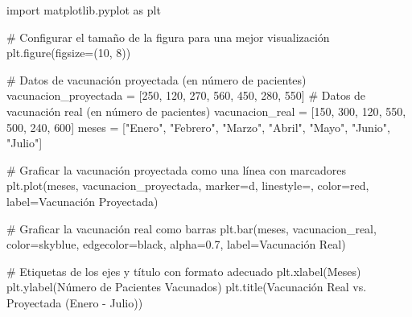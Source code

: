 \documentclass[
  jou,
  floatsintext,
  longtable,
  a4paper,
  nolmodern,
  notxfonts,
  notimes,
  colorlinks=true,linkcolor=blue,citecolor=blue,urlcolor=blue]{apa7}
\newenvironment{Shaded}{\begin{snugshade}}{\end{snugshade}}
\newcommand{\CommentTok}[1]{\textcolor[rgb]{0.37,0.37,0.37}{#1}}
\newcommand{\DecValTok}[1]{\textcolor[rgb]{0.68,0.00,0.00}{#1}}
\newcommand{\FloatTok}[1]{\textcolor[rgb]{0.68,0.00,0.00}{#1}}
\newcommand{\ImportTok}[1]{\textcolor[rgb]{0.00,0.46,0.62}{#1}}
\newcommand{\NormalTok}[1]{\textcolor[rgb]{0.00,0.23,0.31}{#1}}
\newcommand{\OperatorTok}[1]{\textcolor[rgb]{0.37,0.37,0.37}{#1}}
\newcommand{\StringTok}[1]{\textcolor[rgb]{0.13,0.47,0.30}{#1}}
\begin{document}
\begin{Shaded}
\begin{Highlighting}[]
\ImportTok{import}\NormalTok{ matplotlib.pyplot }\ImportTok{as}\NormalTok{ plt}

\CommentTok{\# Configurar el tamaño de la figura para una mejor visualización}
\NormalTok{plt.figure(figsize}\OperatorTok{=}\NormalTok{(}\DecValTok{10}\NormalTok{, }\DecValTok{8}\NormalTok{))}

\CommentTok{\# Datos de vacunación proyectada (en número de pacientes)}
\NormalTok{vacunacion\_proyectada }\OperatorTok{=}\NormalTok{ [}\DecValTok{250}\NormalTok{, }\DecValTok{120}\NormalTok{, }\DecValTok{270}\NormalTok{, }\DecValTok{560}\NormalTok{, }\DecValTok{450}\NormalTok{, }\DecValTok{280}\NormalTok{, }\DecValTok{550}\NormalTok{]}
\CommentTok{\# Datos de vacunación real (en número de pacientes)}
\NormalTok{vacunacion\_real }\OperatorTok{=}\NormalTok{ [}\DecValTok{150}\NormalTok{, }\DecValTok{300}\NormalTok{, }\DecValTok{120}\NormalTok{, }\DecValTok{550}\NormalTok{, }\DecValTok{500}\NormalTok{, }\DecValTok{240}\NormalTok{, }\DecValTok{600}\NormalTok{]}
\NormalTok{meses }\OperatorTok{=}\NormalTok{ [}\StringTok{"Enero"}\NormalTok{, }\StringTok{"Febrero"}\NormalTok{, }\StringTok{"Marzo"}\NormalTok{, }\StringTok{"Abril"}\NormalTok{, }\StringTok{"Mayo"}\NormalTok{, }\StringTok{"Junio"}\NormalTok{, }\StringTok{"Julio"}\NormalTok{]}

\CommentTok{\# Graficar la vacunación proyectada como una línea con marcadores}
\NormalTok{plt.plot(meses, vacunacion\_proyectada, marker}\OperatorTok{=}\StringTok{\textquotesingle{}d\textquotesingle{}}\NormalTok{, linestyle}\OperatorTok{=}\StringTok{\textquotesingle{}{-}{-}\textquotesingle{}}\NormalTok{, color}\OperatorTok{=}\StringTok{\textquotesingle{}red\textquotesingle{}}\NormalTok{, label}\OperatorTok{=}\StringTok{\textquotesingle{}Vacunación Proyectada\textquotesingle{}}\NormalTok{)}

\CommentTok{\# Graficar la vacunación real como barras}
\NormalTok{plt.bar(meses, vacunacion\_real, color}\OperatorTok{=}\StringTok{\textquotesingle{}skyblue\textquotesingle{}}\NormalTok{, edgecolor}\OperatorTok{=}\StringTok{\textquotesingle{}black\textquotesingle{}}\NormalTok{, alpha}\OperatorTok{=}\FloatTok{0.7}\NormalTok{, label}\OperatorTok{=}\StringTok{\textquotesingle{}Vacunación Real\textquotesingle{}}\NormalTok{)}

\CommentTok{\# Etiquetas de los ejes y título con formato adecuado}
\NormalTok{plt.xlabel(}\StringTok{\textquotesingle{}Meses\textquotesingle{}}\NormalTok{)}
\NormalTok{plt.ylabel(}\StringTok{\textquotesingle{}Número de Pacientes Vacunados\textquotesingle{}}\NormalTok{)}
\NormalTok{plt.title(}\StringTok{\textquotesingle{}Vacunación Real vs. Proyectada (Enero {-} Julio)\textquotesingle{}}\NormalTok{)}


\end{Highlighting}
\end{Shaded}
\end{document}
